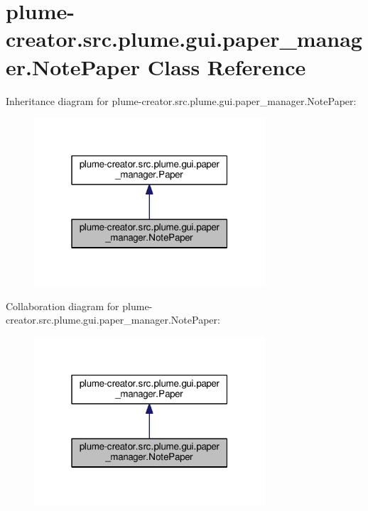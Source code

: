 \hypertarget{classplume-creator_1_1src_1_1plume_1_1gui_1_1paper__manager_1_1_note_paper}{}\section{plume-\/creator.src.\+plume.\+gui.\+paper\+\_\+manager.\+Note\+Paper Class Reference}
\label{classplume-creator_1_1src_1_1plume_1_1gui_1_1paper__manager_1_1_note_paper}


Inheritance diagram for plume-\/creator.src.\+plume.\+gui.\+paper\+\_\+manager.\+Note\+Paper\+:\nopagebreak
\begin{figure}[H]
\begin{center}
\leavevmode
\includegraphics[width=244pt]{classplume-creator_1_1src_1_1plume_1_1gui_1_1paper__manager_1_1_note_paper__inherit__graph}
\end{center}
\end{figure}


Collaboration diagram for plume-\/creator.src.\+plume.\+gui.\+paper\+\_\+manager.\+Note\+Paper\+:\nopagebreak
\begin{figure}[H]
\begin{center}
\leavevmode
\includegraphics[width=244pt]{classplume-creator_1_1src_1_1plume_1_1gui_1_1paper__manager_1_1_note_paper__coll__graph}
\end{center}
\end{figure}
